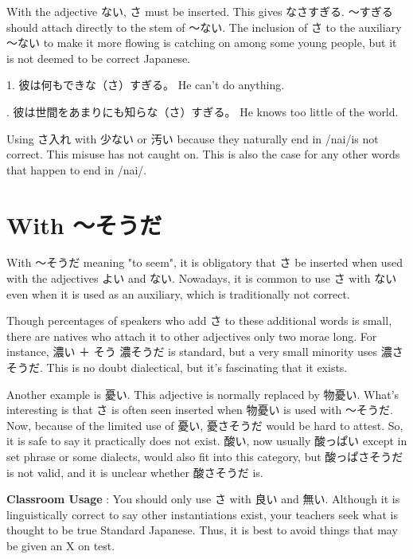 \par{ With the adjective ない, さ must be inserted. This gives なさすぎる. ～すぎる should attach directly to the stem of ～ない. The inclusion of さ to the auxiliary ～ない to make it more flowing is catching on among some young people, but it is not deemed to be correct Japanese. }

\par{1. 彼は何もできな（さ）すぎる。 \hfill\break
He can't do anything. }

\par{ \hfill{}. 彼は世間をあまりにも知らな（さ）すぎる。 \hfill\break
He knows too little of the world. }

\par{ Using さ入れ with 少ない or 汚い because they naturally end in \slash nai\slash  is not correct. This misuse has not caught on. This is also the case for any other words that happen to end in \slash nai\slash . }
      
\section{With ～そうだ}
 
\par{ With ～そうだ meaning "to seem", it is obligatory that さ be inserted when used with the adjectives よい and ない. Nowadays, it is common to use さ with ない even when it is used as an auxiliary, which is traditionally not correct. }

\par{ Though percentages of speakers who add さ to these additional words is small, there are natives who attach it to other adjectives only two morae long. For instance, 濃い ＋ そう \textrightarrow  濃そうだ is standard, but a very small minority uses 濃さそうだ. This is no doubt dialectical, but it's fascinating that it exists. }

\par{ Another example is 憂い. This adjective is normally replaced by 物憂い. What's interesting is that さ is often seen inserted when 物憂い is used with ～そうだ. Now, because of the limited use of 憂い, 憂さそうだ would be hard to attest. So, it is safe to say it practically does not exist. 酸い, now usually 酸っぱい except in set phrase or some dialects, would also fit into this category, but 酸っぱさそうだ is not valid, and it is unclear whether 酸さそうだ is. }
 
\par{\textbf{Classroom Usage }: You should only use さ with 良い and 無い. Although it is linguistically correct to say other instantiations exist, your teachers seek what is thought to be true Standard Japanese. Thus, it is best to avoid things that may be given an X on test. }
    